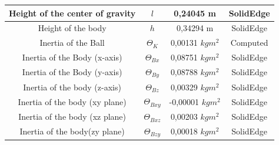 \documentclass[twoside,colorback,accentcolor=tud4c,11pt]{tudreport}
\begin{document}
\begin{table}[]
\begin{tabular}{cccc}
\multicolumn{1}{|c|}{Height of the center of gravity}                                                                   & \multicolumn{1}{c|}{$l$}                       & \multicolumn{1}{c|}{0,24045 m}                             & \multicolumn{1}{c|}{SolidEdge}             \\ \hline
\multicolumn{1}{|c|}{Height of the body}                                                                                & \multicolumn{1}{c|}{$h$}                       & \multicolumn{1}{c|}{0,34294 m}                             & \multicolumn{1}{c|}{SolidEdge}             \\ \hline
\multicolumn{1}{|c|}{Inertia of the Ball}                                                                               & \multicolumn{1}{c|}{$\Theta_{K}$}           & \multicolumn{1}{c|}{0,00131 $kgm^{2}$}     & \multicolumn{1}{c|}{Computed}              \\ \hline
\multicolumn{1}{|c|}{Inertia of the Body (x-axis)}                                                                      & \multicolumn{1}{c|}{$\Theta_{Bx}$}          & \multicolumn{1}{c|}{0,08751 $kgm^{2}$}     & \multicolumn{1}{c|}{SolidEdge}             \\ \hline
\multicolumn{1}{|c|}{Inertia of the Body (y-axis)}                                                                      & \multicolumn{1}{c|}{$\Theta_{By}$}          & \multicolumn{1}{c|}{0,08788 $kgm^{2}$}     & \multicolumn{1}{c|}{SolidEdge}             \\ \hline
\multicolumn{1}{|c|}{Inertia of the body (z-axis)}                                                                      & \multicolumn{1}{c|}{$\Theta_{Bz}$}          & \multicolumn{1}{c|}{0,00329 $kgm^{2}$}     & \multicolumn{1}{c|}{SolidEdge}             \\ \hline
\multicolumn{1}{|c|}{Inertia of the body (xy plane)}                                                                    & \multicolumn{1}{c|}{$\Theta_{Bxy}$}         & \multicolumn{1}{c|}{-0,00001 $kgm^{2}$}    & \multicolumn{1}{c|}{SolidEdge}             \\ \hline
\multicolumn{1}{|c|}{Inertia of the body (xz plane)}                                                                    & \multicolumn{1}{c|}{$\Theta_{Bxz}$}         & \multicolumn{1}{c|}{0,00203 $kgm^{2}$}     & \multicolumn{1}{c|}{SolidEdge}             \\ \hline
\multicolumn{1}{|c|}{Inertia of the body(zy plane)}                                                                     & \multicolumn{1}{c|}{$\Theta_{Bzy}$}         & \multicolumn{1}{c|}{0,00018 $kgm^{2}$}     & \multicolumn{1}{c|}{SolidEdge}             \\ \hline

\end{tabular}
\end{table}
\end{document}
